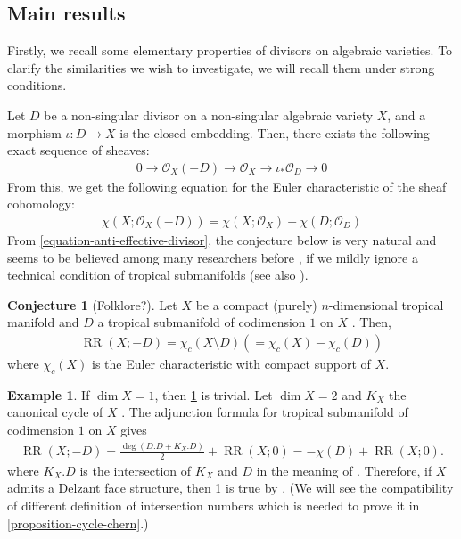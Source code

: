 \documentclass[a4paper,dvipdfmx,reqno,12pt]{amsart}
\theoremstyle{definition}
\newtheorem{example}[theorem]{Example}
\newtheorem{conjecture}[theorem]{Conjecture}
\newcommand{\opn}[1]{\operatorname{#1}}
\numberwithin{equation}{section}
\begin{document}
\subsection{Main results}

Firstly, we recall some elementary properties
of divisors on algebraic varieties. 
To clarify the similarities we wish to investigate,
we will recall them under strong conditions.

Let $D$ be a non-singular divisor on a non-singular
algebraic variety $X$, and a morphism  
$\iota\colon D\to X$ is the closed embedding.
Then, there exists the following exact sequence
of sheaves:
\begin{align}
     0\to \mathcal{O}_X(-D)\to 
\mathcal{O}_X\to \iota_*\mathcal{O}_D\to 0
\end{align}
From this, we get the following equation for the Euler
characteristic of the sheaf cohomology:
\begin{align}
\label{equation-anti-effective-divisor}
\chi(X;\mathcal{O}_X(-D))=\chi(X;\mathcal{O}_X)
-\chi(D;\mathcal{O}_D)
\end{align}
From \eqref{equation-anti-effective-divisor},
the conjecture below is very natural and 
seems to be believed among many researchers
before \cite{demedrano2023chern}, if
we mildly ignore a technical condition of 
tropical submanifolds
\cite[Definition 2.14]{demedrano2023chern} (see also
\cite[Definition 4.3]{shaw2015tropical}).

\begin{conjecture}[{Folklore?}]
\label{conjecture-rr-c-euler}
Let $X$ be a compact
(purely) $n$-dimensional tropical manifold and
$D$ a tropical submanifold of codimension $1$
on $X$ 
\cite[Definition 2.14]{demedrano2023chern}.
Then,
\begin{align}
\opn{RR}(X;-D)=
\chi_c (X\setminus D) (=\chi_c (X)-\chi_c(D))
\end{align}
where $\chi_c(X)$ is the Euler characteristic
with compact support of $X$.
\end{conjecture}

\begin{example}
If $\dim X=1$, then 
\cref{conjecture-rr-c-euler} is trivial.
Let $\dim X=2$ and $K_X$ the canonical cycle of
$X$ \cite[Definition 5.8]{MR2275625}.
The adjunction formula for tropical submanifold
of codimension $1$ on $X$
\cite[Theorem 6]{shaw2015tropical} gives
\begin{align}
\opn{RR}(X;-D)=\frac{\opn{deg}(D.D+K_X.D)}{2}+\opn{RR}(X;0)
=-\chi(D)+\opn{RR}(X;0).
\end{align}
where $K_X.D$ is the intersection of 
$K_X$ and $D$ in the meaning of \cite{shaw2015tropical}.
Therefore, if $X$ admits a Delzant face structure,
then \cref{conjecture-rr-c-euler} is true
by \cite[Theorem 6.3]{demedrano2023chern}.
(We will see the compatibility of different definition of
intersection numbers which is needed to prove it in
\cref{proposition-cycle-chern}.)
\end{example}
\end{document}
